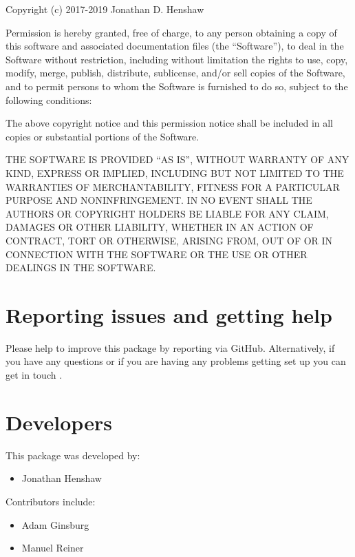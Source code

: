 \documentclass[letterpaper,10pt,english]{sphinxmanual}
\begin{document}
Copyright (c) 2017-2019 Jonathan D. Henshaw

Permission is hereby granted, free of charge, to any person obtaining a copy
of this software and associated documentation files (the “Software”), to deal
in the Software without restriction, including without limitation the rights
to use, copy, modify, merge, publish, distribute, sublicense, and/or sell
copies of the Software, and to permit persons to whom the Software is
furnished to do so, subject to the following conditions:

The above copyright notice and this permission notice shall be included in all
copies or substantial portions of the Software.

THE SOFTWARE IS PROVIDED “AS IS”, WITHOUT WARRANTY OF ANY KIND, EXPRESS OR
IMPLIED, INCLUDING BUT NOT LIMITED TO THE WARRANTIES OF MERCHANTABILITY,
FITNESS FOR A PARTICULAR PURPOSE AND NONINFRINGEMENT. IN NO EVENT SHALL THE
AUTHORS OR COPYRIGHT HOLDERS BE LIABLE FOR ANY CLAIM, DAMAGES OR OTHER
LIABILITY, WHETHER IN AN ACTION OF CONTRACT, TORT OR OTHERWISE, ARISING FROM,
OUT OF OR IN CONNECTION WITH THE SOFTWARE OR THE USE OR OTHER DEALINGS IN THE
SOFTWARE.


\chapter{Reporting issues and getting help}
\label{\detokenize{index:reporting-issues-and-getting-help}}
Please help to improve this package by reporting  via GitHub. Alternatively, if
you have any questions or if you are having any problems getting set up you can
get in touch .


\chapter{Developers}
\label{\detokenize{index:developers}}
This package was developed by:
\begin{itemize}
\item {} 
Jonathan Henshaw

\end{itemize}

Contributors include:
\begin{itemize}
\item {} 
Adam Ginsburg

\item {} 
Manuel Reiner

\end{itemize}
\end{document}
